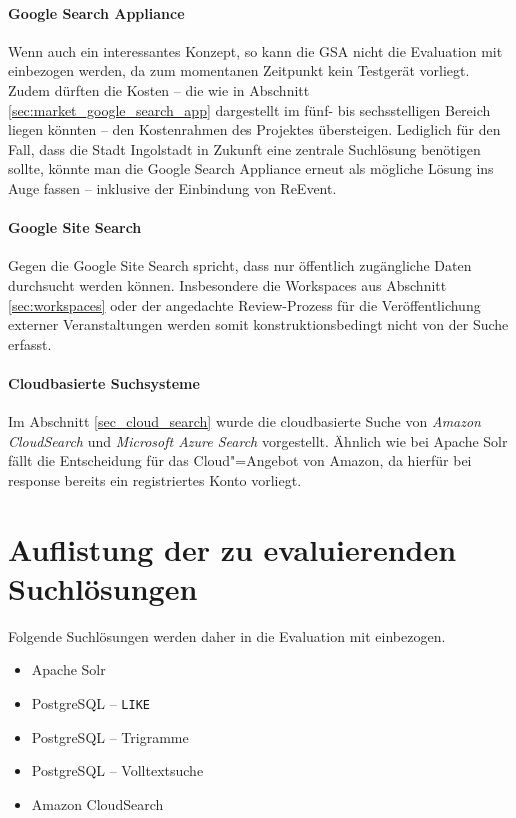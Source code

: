 \paragraph{Google Search Appliance}
Wenn auch ein interessantes Konzept, so kann die GSA nicht die Evaluation mit einbezogen werden, da zum momentanen Zeitpunkt kein Testgerät vorliegt. Zudem dürften die Kosten -- die wie in Abschnitt \ref{sec:market_google_search_app} dargestellt im fünf- bis sechsstelligen Bereich liegen könnten -- den Kostenrahmen des Projektes übersteigen. Lediglich für den Fall, dass die Stadt Ingolstadt in Zukunft eine zentrale Suchlösung benötigen sollte, könnte man die Google Search Appliance erneut als mögliche Lösung ins Auge fassen -- inklusive der Einbindung von ReEvent.

\paragraph{Google Site Search}
Gegen die Google Site Search spricht, dass nur öffentlich zugängliche Daten durchsucht werden können. Insbesondere die Workspaces aus Abschnitt \ref{sec:workspaces} oder der angedachte Review-Prozess für die Veröffentlichung externer Veranstaltungen werden somit konstruktionsbedingt nicht von der Suche erfasst.

\paragraph{Cloudbasierte Suchsysteme}
Im Abschnitt \ref{sec_cloud_search} wurde die cloudbasierte Suche von \emph{Amazon CloudSearch} und \emph{Microsoft Azure Search} vorgestellt. Ähnlich wie bei Apache Solr fällt die Entscheidung für das Cloud"=Angebot von Amazon, da hierfür bei response bereits ein registriertes Konto vorliegt.

\section{Auflistung der zu evaluierenden Suchlösungen}

Folgende Suchlösungen werden daher in die Evaluation mit einbezogen.

\begin{itemize}
	\item Apache Solr
	\item PostgreSQL -- \texttt{LIKE}
	\item PostgreSQL -- Trigramme
	\item PostgreSQL -- Volltextsuche
	\item Amazon CloudSearch
\end{itemize}